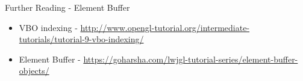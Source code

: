 \begin{frame}{Further Reading - Element Buffer}
	\begin{itemize}
		\item VBO indexing - \url{http://www.opengl-tutorial.org/intermediate-tutorials/tutorial-9-vbo-indexing/}
		\item Element Buffer - \url{https://goharsha.com/lwjgl-tutorial-series/element-buffer-objects/}
	\end{itemize}
\end{frame}


